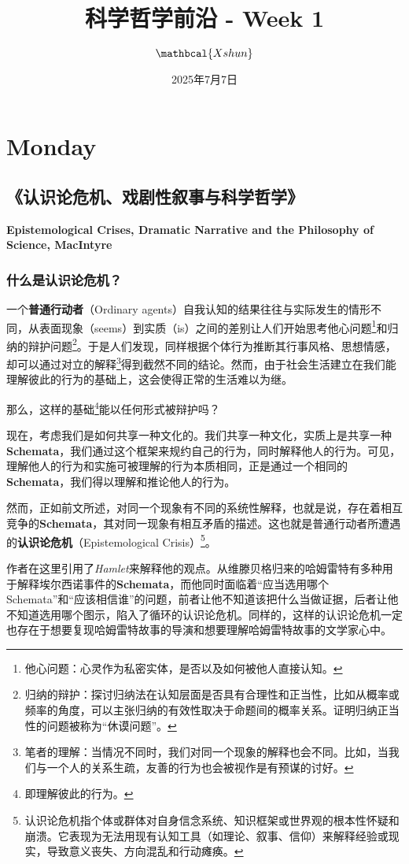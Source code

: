 \documentclass[12pt, a4paper, oneside]{ctexart}
\title{\textbf{科学哲学前沿 - Week 1}}
\author{$\mathbcal{Xshun}$}
\date{2025年7月7日}
\renewcommand{\b}{\textbf}
\newcommand{\f}{\footnote}
\begin{document}
\maketitle
{
\hypersetup{linkcolor=red}
\tableofcontents
}
\section {Monday}
\subsection{《认识论危机、戏剧性叙事与科学哲学》}
\textbf{Epistemological Crises, Dramatic Narrative and the Philosophy of Science, MacIntyre}
\subsubsection{什么是认识论危机？}

一个\b{普通行动者}（Ordinary agents）自我认知的结果往往与实际发生的情形不同，从表面现象（seems）到实质（is）之间的差别让人们开始思考他心问题\f{他心问题：心灵作为私密实体，是否以及如何被他人直接认知。}和归纳的辩护问题\f{归纳的辩护：探讨归纳法在认知层面是否具有合理性和正当性，比如从概率或频率的角度，可以主张归纳的有效性取决于命题间的概率关系。证明归纳正当性的问题被称为“休谟问题”。}。于是人们发现，同样根据个体行为推断其行事风格、思想情感，却可以通过对立的解释\f{笔者的理解：当情况不同时，我们对同一个现象的解释也会不同。比如，当我们与一个人的关系生疏，友善的行为也会被视作是有预谋的讨好。}得到截然不同的结论。然而，由于社会生活建立在我们能理解彼此的行为的基础上，这会使得正常的生活难以为继。

那么，这样的基础\f{即理解彼此的行为。}能以任何形式被辩护吗？

现在，考虑我们是如何共享一种文化的。我们共享一种文化，实质上是共享一种\b{Schemata}，我们通过这个框架来规约自己的行为，同时解释他人的行为。可见，理解他人的行为和实施可被理解的行为本质相同，正是通过一个相同的\b{Schemata}，我们得以理解和推论他人的行为。

然而，正如前文所述，对同一个现象有不同的系统性解释，也就是说，存在着相互竞争的\b{Schemata}，其对同一现象有相互矛盾的描述。这也就是普通行动者所遭遇的\b{认识论危机}（Epistemological Crisis）\f{认识论危机指个体或群体对自身信念系统、知识框架或世界观的根本性怀疑和崩溃。它表现为无法用现有认知工具（如理论、叙事、信仰）来解释经验或现实，导致意义丧失、方向混乱和行动瘫痪。}。

作者在这里引用了\textit{Hamlet}来解释他的观点。从维滕贝格归来的哈姆雷特有多种用于解释埃尔西诺事件的\b{Schemata}，而他同时面临着“应当选用哪个Schemata”和“应该相信谁”的问题，前者让他不知道该把什么当做证据，后者让他不知道选用哪个图示，陷入了循环的认识论危机。同样的，这样的认识论危机一定也存在于想要复现哈姆雷特故事的导演和想要理解哈姆雷特故事的文学家心中。
\end{document}

